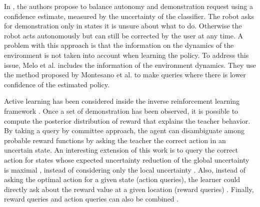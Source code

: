 In \cite{chernova09jair}, the authors propose to balance autonomy and demonstration request using a confidence estimate, measured by the uncertainty of the classifier. The robot asks for demonstration only in states it is unsure about what to do. Otherwise the robot acts autonomously but can still be corrected by the user at any time. A problem with this approach is that the information on the dynamics of the environment is not taken into account when learning the policy. To address this issue, Melo et al. \cite{melo2010learning} includes the information of the environment dynamics. They use the method proposed by Montesano et al. \cite{montesano2012active} to make queries where there is lower confidence of the estimated policy.



Active learning has been considered inside the inverse reinforcement learning framework \cite{macl09airl}. Once a set of demonstration has been observed, it is possible to compute the posterior distribution of reward that explains the teacher behavior. By taking a query by committee approach, the agent can disambiguate among probable reward functions by asking the teacher the correct action in an uncertain state. An interesting extension of this work is to query the correct action for states whose expected uncertainty reduction of the global uncertainty is maximal \cite{cohn2010selecting,cohn2011comparing}, instead of considering only the local uncertainty \cite{macl09airl}. Also,  instead of asking the optimal action for a given state (action queries), the learner could directly ask about the reward value at a given location (reward queries) \cite{regan2011eliciting}. Finally, reward queries and action queries can also be combined \cite{melo2013multi}.





